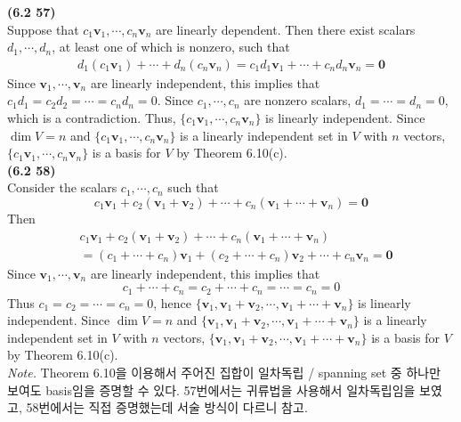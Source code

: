 \textbf{(6.2 57)} \\
Suppose that $c_1\textbf{v}_1, \cdots, c_n\textbf{v}_n$ are linearly dependent. Then there exist scalars $d_1, \cdots, d_n$, at least one of which is nonzero, such that \begin{align*}
	d_1(c_1\textbf{v}_1) + \cdots + d_n(c_n\textbf{v}_n) = c_1d_1\textbf{v}_1 + \cdots + c_nd_n\textbf{v}_n = \textbf{0}
\end{align*} Since $\textbf{v}_1, \cdots, \textbf{v}_n$ are linearly independent, this implies that $c_1d_1 = c_2d_2 = \cdots = c_nd_n = 0$. Since $c_1, \cdots, c_n$ are nonzero scalars, $d_1 = \cdots = d_n = 0$, which is a contradiction. Thus, $\{c_1\textbf{v}_1, \cdots, c_n\textbf{v}_n\}$ is linearly independent. Since $\dim V = n$ and $\{c_1\textbf{v}_1, \cdots, c_n\textbf{v}_n\}$ is a linearly independent set in $V$ with $n$ vectors, $\{c_1\textbf{v}_1, \cdots, c_n\textbf{v}_n\}$ is a basis for $V$ by Theorem 6.10(c). \\

\textbf{(6.2 58)} \\
Consider the scalars $c_1, \cdots, c_n$ such that \begin{equation*}
	c_1\textbf{v}_1 + c_2(\textbf{v}_1 + \textbf{v}_2) + \cdots + c_n(\textbf{v}_1 + \cdots + \textbf{v}_n) = \textbf{0}
\end{equation*} Then \begin{align*}
	&c_1\textbf{v}_1 + c_2(\textbf{v}_1 + \textbf{v}_2) + \cdots + c_n(\textbf{v}_1 + \cdots + \textbf{v}_n) \\
	&= (c_1 + \cdots + c_n)\textbf{v}_1 + (c_2 + \cdots + c_n)\textbf{v}_2 + \cdots + c_n\textbf{v}_n = \textbf{0}
\end{align*} Since $\textbf{v}_1, \cdots, \textbf{v}_n$ are linearly independent, this implies that \begin{equation*}
	c_1 + \cdots + c_n = c_2 + \cdots + c_n = \cdots = c_n = 0
\end{equation*} Thus $c_1 = c_2 = \cdots = c_n = 0$, hence $\{\textbf{v}_1, \textbf{v}_1 + \textbf{v}_2, \cdots, \textbf{v}_1 + \cdots + \textbf{v}_n\}$ is linearly independent. Since $\dim V = n$ and $\{\textbf{v}_1, \textbf{v}_1 + \textbf{v}_2, \cdots, \textbf{v}_1 + \cdots + \textbf{v}_n\}$ is a linearly independent set in $V$ with $n$ vectors, $\{\textbf{v}_1, \textbf{v}_1 + \textbf{v}_2, \cdots, \textbf{v}_1 + \cdots + \textbf{v}_n\}$ is a basis for $V$ by Theorem 6.10(c). \\

\textit{Note.} Theorem 6.10을 이용해서 주어진 집합이 일차독립 / spanning set 중 하나만 보여도 basis임을 증명할 수 있다. 57번에서는 귀류법을 사용해서 일차독립임을 보였고, 58번에서는 직접 증명했는데 서술 방식이 다르니 참고. \\

